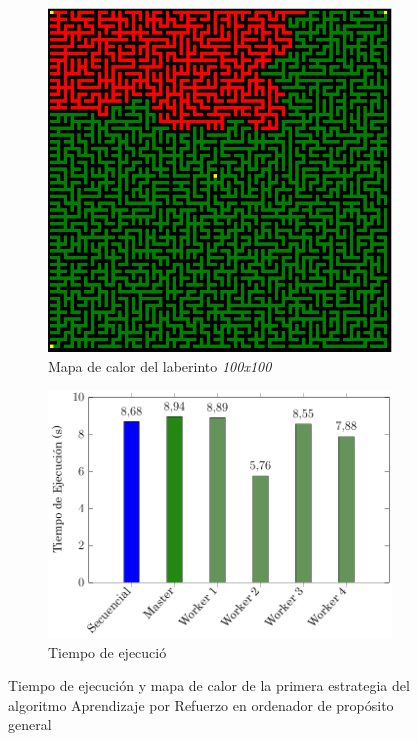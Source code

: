 		\begin{figure}[!h]
			\centering
			\begin{subfigure}[t]{0.4\textwidth}
				\centering
				\includegraphics[width=\textwidth]{images/chapter_4/mapa_calor}
				\caption{Mapa de calor del laberinto \textit{100x100}}
				\label{fig:RL_mapa_calor}
			\end{subfigure}
			\hfill
			\begin{subfigure}[t]{0.5\textwidth}
				\centering
				\includegraphics[width=\textwidth]{images/chapter_4/histo}
				\caption{Tiempo de ejecució}
				\label{fig:RL_histo}
			\end{subfigure}
			\caption{Tiempo de ejecución y mapa de calor de la primera estrategia del algoritmo Aprendizaje por Refuerzo en ordenador de propósito general}
			\label{fig:RL_estrategia1}
		\end{figure}
		
